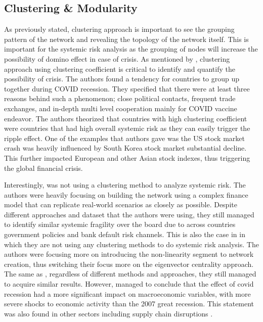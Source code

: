 \documentclass[a4paper,11pt]{article}
\begin{document}
\subsection{Clustering \& Modularity}
As previously stated, clustering approach is important to see the grouping pattern of the network and revealing the topology of the network itself. This is important for the systemic risk analysis as the grouping of nodes will increase the possibility of domino effect in case of crisis. As mentioned by \cite{Lai_Hu_2021}, clustering approach using clustering coefficient is critical to identify and quantify the possibility of crisis. The authors found a tendency for countries to group up together during COVID recession. They specified that there were at least three reasons behind such a phenomenon; close political contacts, frequent trade exchanges, and in-depth multi level cooperation mainly for COVID vaccine endeavor. The authors theorized that countries with high clustering coefficient were countries that had high overall systemic risk as they can easily trigger the ripple effect. One of the examples that authors gave was the US stock market crash was heavily influenced by South Korea stock market substantial decline. This further impacted European and other Asian stock indexes, thus triggering the global financial crisis.

Interestingly, \cite{Duan_El_Ghoul_Guedhami_Li_Li_2020} was not using a clustering method to analyze systemic risk. The authors were heavily focusing on building the network using a complex finance model that can replicate real-world scenarios as closely as possible. Despite different approaches and dataset that the authors were using, they still managed to identify similar systemic fragility over the board due to across countries government policies and bank default risk channels. This is also the case in \cite{Zhang_Yin_Sha_2023} in which they are not using any clustering methods to do systemic risk analysis. The authors were focusing more on introducing the non-linearity segment to network creation, thus switching their focus more on the eigenvector centrality approach. The same as \cite{Duan_El_Ghoul_Guedhami_Li_Li_2020}, regardless of different methods and approaches, they still managed to acquire similar results. However, \cite{Duan_El_Ghoul_Guedhami_Li_Li_2020} managed to conclude that the effect of covid recession had a more significant impact on macroeconomic variables, with more severe shocks to economic activity than the 2007 great recession. This statement was also found in other sectors including supply chain disruptions \citep{Li_Farmanesh_Kirikkaleli_Itani_2021, Golan_Jernegan_Linkov_2020}.
\end{document}
